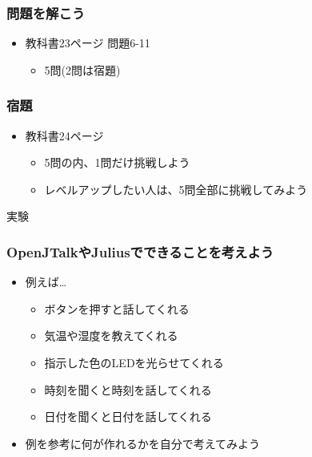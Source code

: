 \documentclass[14pt]{beamer}
\begin{document}
\begin{frame}
  \frametitle{問題を解こう}
  \begin{itemize}
    \item 教科書23ページ 問題6-11
    \begin{itemize}
      \item 5問(2問は宿題)
    \end{itemize}
  \end{itemize}
\end{frame}

\begin{frame}
  \frametitle{宿題}
  \begin{itemize}
    \item 教科書24ページ
    \begin{itemize}
      \item 5問の内、1問だけ挑戦しよう
      \item レベルアップしたい人は、5問全部に挑戦してみよう
    \end{itemize}
  \end{itemize}
\end{frame}

\begin{frame}
  \centering
  実験
\end{frame}

\begin{frame}
  \frametitle{OpenJTalkやJuliusでできることを考えよう}
  \begin{itemize}
    \item 例えば…
    \begin{itemize}
      \item ボタンを押すと話してくれる
      \item 気温や湿度を教えてくれる
      \item 指示した色のLEDを光らせてくれる
      \item 時刻を聞くと時刻を話してくれる
      \item 日付を聞くと日付を話してくれる
    \end{itemize}
    \item 例を参考に何が作れるかを自分で考えてみよう
  \end{itemize}
\end{frame}
\end{document}

